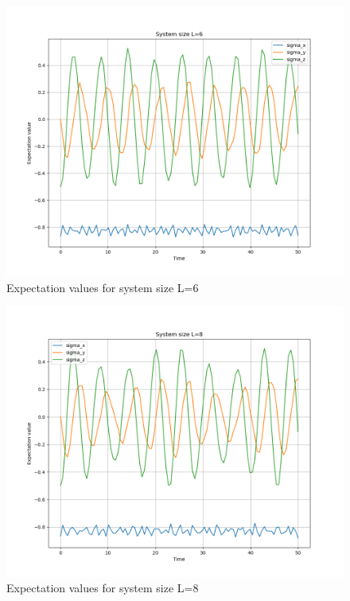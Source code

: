 \documentclass[12pt]{article}
\begin{document}
\begin{figure}
    \centering
    \includegraphics[width=\textwidth]{Expectation_values_L_6.png}
    \caption{Expectation values for system size L=6}
\end{figure}
\begin{figure}
    \centering
    \includegraphics[width=\textwidth]{Expectation_values_L_8.png}
    \caption{Expectation values for system size L=8}
\end{figure}
\end{document}
